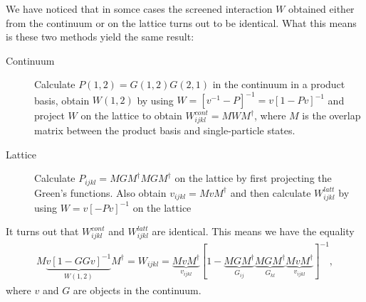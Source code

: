 \documentclass[12pt,a4paper]{scrartcl}
\numberwithin{equation}{section}
\begin{document}
We have noticed that in somce cases the screened interaction $W$ obtained
either from the continuum or on the lattice turns out to be identical.
What this means is these two methods yield the same result:
\begin{description}
 \item[Continuum] Calculate $P(1,2)=G(1,2)G(2,1)$ in the continuum in a product basis, obtain 
 $W(1,2)$ by using $W = [v^{-1} - P]^{-1}= v[1 - Pv]^{-1}$ and project $W$ on the lattice to obtain 
 $W^{cont}_{ijkl} = MWM^{\dagger}$, where $M$ is the overlap matrix between the product basis and single-particle states.
 
 \item[Lattice] Calculate $P_{ijkl}=MGM^{\dagger} M G M^{\dagger}$ 
 on the lattice by first projecting the 
 Green's functions. Also obtain $v_{ijkl}=MvM^{\dagger}$ and then calculate $W^{latt}_{ijkl}$ by using 
 $W = v[ - Pv]^{-1} $ on the lattice
\end{description}
It turns out that $W^{cont}_{ijkl}$ and $W^{latt}_{ijkl}$ are identical.
This means we have the equality
\begin{align}
 M \underbrace{ v [ 1 - GGv ]^{-1} }_{W(1,2)} M^{\dagger} 
 = W_{ijkl} 
 = \underbrace{M v M^{\dagger}}_{v_{ijkl}} [ 1 
 - \underbrace{MGM^{\dagger}}_{G_{ij}} \underbrace{MGM^{\dagger}}_{G_{kl}} 
   \underbrace{MvM^{\dagger} }_{v_{ijkl}} ]^{-1} ,
   \label{eq:W_equality_continuum_lattice}
\end{align}
where $v$ and $G$ are objects in the continuum.
\end{document}
